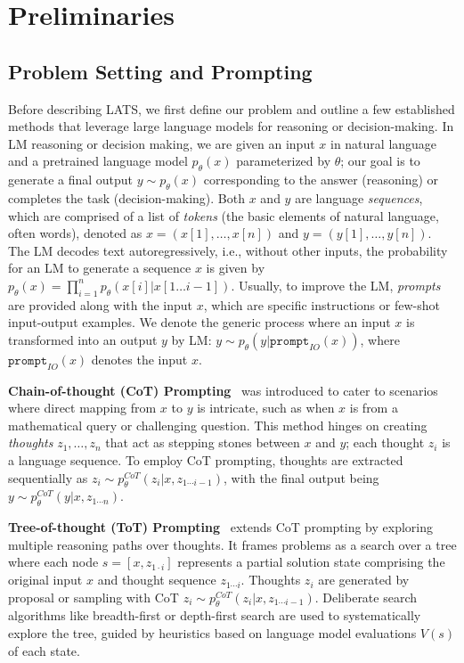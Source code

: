 \documentclass{article} \usepackage{iclr2024_conference,times}
\begin{document}
\section{Preliminaries}

\subsection{Problem Setting and Prompting}

Before describing LATS, we first define our problem and outline a few established methods that leverage large language models for reasoning or decision-making. In LM reasoning or decision making, we are given an input $x$ in natural language and a pretrained language model $p_\theta(x)$ parameterized by $\theta$; our goal is to generate a final output $y\sim p_\theta(x)$ corresponding to the answer (reasoning) or completes the task (decision-making). Both $x$ and $y$ are language \textit{sequences}, which are comprised of a list of \textit{tokens} (the basic elements of natural language, often words), denoted as \( x = (x[1], \dots, x[n]) \) and \( y = (y[1], \dots, y[n]) \). The LM decodes text autoregressively, i.e., without other inputs, the probability for an LM to generate a sequence $x$ is given by \( p_\theta(x) = \prod_{i=1}^{n} p_\theta(x[i] | x[1 \dots i-1]) \). Usually, to improve the LM, \textit{prompts} are provided along with the input $x$, which are specific instructions or few-shot input-output examples. We denote the generic process where an input \( x \) is transformed into an output \( y \) by LM: \( y \sim p_\theta(y | \texttt{prompt}_{IO}(x)) \), where \( \texttt{prompt}_{IO}(x) \) denotes the input \( x \).

\textbf{Chain-of-thought (CoT) Prompting}~\citep{wei2022chain} was introduced to cater to scenarios where direct mapping from \( x \) to \( y \) is intricate, such as when \( x \) is from a mathematical query or challenging question. This method hinges on creating \textit{thoughts} \( z_1, \dots, z_n \) that act as stepping stones between \( x \) and \( y \); each thought $z_i$ is a language sequence. To employ CoT prompting, thoughts are extracted sequentially as \( z_i \sim p_\theta^{CoT}(z_i | x, z_{1\cdots i-1}) \), with the final output being \( y \sim p_\theta^{CoT}(y | x, z_{1 \cdots n}) \). 

\textbf{Tree-of-thought (ToT) Prompting}~\citep{yao2023tree} extends CoT prompting by exploring multiple reasoning paths over thoughts. It frames problems as a search over a tree where each node $s=[x, z_{1\cdot i}]$ represents a partial solution state comprising the original input $x$ and thought sequence $z_{1\cdots i}$. Thoughts $z_{i}$ are generated by proposal or sampling with CoT \( z_i \sim p_\theta^{CoT}(z_i | x, z_{1\cdots i-1}) \). Deliberate search algorithms like breadth-first or depth-first search are used to systematically explore the tree, guided by heuristics based on language model evaluations $V(s)$ of each state. 
\end{document}
